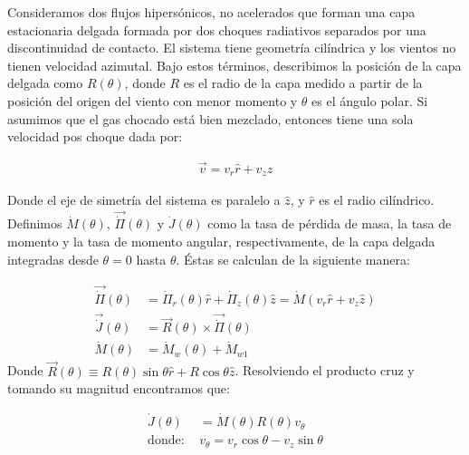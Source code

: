 Consideramos dos flujos hipersónicos, no acelerados que forman una capa estacionaria delgada
formada por dos choques radiativos separados por una discontinuidad de contacto. El sistema
tiene geometría cilíndrica y los vientos no tienen velocidad azimutal. Bajo estos términos,
describimos la posición de la capa delgada como $R(\theta)$, donde $R$ es el radio de la capa
medido a partir de la posición del origen del viento con menor momento y $\theta$ es el ángulo
polar. Si asumimos que el gas chocado está bien mezclado, entonces tiene una sola velocidad
pos choque dada por:

\begin{align}
  \vec{v} = v_r \hat{r} + v_z \hat{z}
\end{align}

Donde el eje de simetría del sistema es paralelo a $\hat{z}$, y $\hat{r}$ es el radio cilíndrico.
Definimos $\dot{M}(\theta)$, $\vec{\dot{\Pi}}(\theta)$ y $\dot{J}(\theta)$ como la tasa de pérdida
de masa, la tasa de momento y la tasa de momento angular, respectivamente, de la capa delgada
integradas desde $\theta=0$ hasta $\theta$. Éstas se calculan de la siguiente manera:

\begin{align}
  \vec{\dot{\Pi}}(\theta) &= \dot{\Pi}_r(\theta) \hat{r} + \dot{\Pi}_z(\theta) \hat{z} = \dot{M}\left(
                      v_r \hat{r} + v_z\hat{z}\right) \label{eq:dot-pi}\\
  \vec{\dot{J}}(\theta) &= \vec{R}(\theta) \times \vec{\dot{\Pi}}(\theta)  \\
  \dot{M}(\theta) &= \dot{M}_w(\theta) + \dot{M}_{w1} \label{eq:dot-M}
\end{align}
Donde $\vec{R}(\theta)\equiv R(\theta)\sin\theta \hat{r} + R\cos\theta \hat{z}$. Resolviendo el producto
cruz y tomando su magnitud encontramos que:

\begin{align}
  \dot{J}(\theta) &= \dot{M}(\theta)R(\theta)v_\theta \label{eq:dot-J}\\
  \mathrm{donde:~} & v_\theta = v_r\cos\theta - v_z\sin\theta \label{eq:v-theta}
\end{align}

